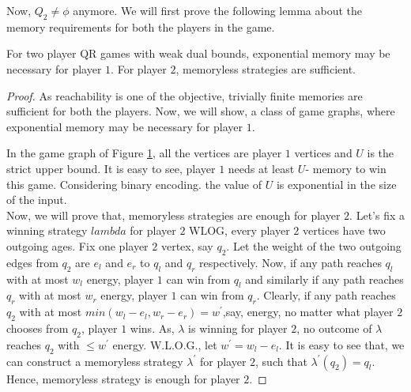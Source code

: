 Now, $Q_2 \not = \phi$ anymore. We will first prove the following lemma about the memory requirements for both the players in the game.\\
\begin{lemma}
\label{mem-lemma}
For two player QR games with weak dual bounds, exponential memory may be necessary for player $1$. For player $2$, memoryless strategies are sufficient.
\end{lemma}
\begin{proof}
As reachability is one of the objective, trivially finite memories are sufficient for both the players. Now, we will show, a class of game graphs, where exponential memory may be necessary for player $1$.\\
\begin{figure}[htb]
\hskip 6cm
\label{expmem-p1}

\end{figure}

In the game graph of Figure \ref{expmem-p1}, all the vertices are player $1$  vertices and $U$ is the strict upper bound. It is easy to see, player $1$ needs at least $U$- memory to win this game. Considering binary encoding. the value of $U$ is exponential in the size of the input.\\
Now, we will prove that, memoryless strategies are enough for player $2$. Let's fix a winning strategy $lambda$ for player $2$  WLOG, every player $2$ vertices have two outgoing ages. Fix one player $2$ vertex, say $q_2$. Let the weight of the two outgoing edges from $q_2$ are $e_l$ and $e_r$ to $q_l$ and $q_r$ respectively. Now, if any path reaches $q_l$ with at most $w_l$ energy, player $1$ can win from $q_l$ and similarly if any path reaches $q_r$ with at most $w_r$ energy, player $1$ can win from $q_r$. Clearly, if any path reaches $q_2$ with at most $min(w_l-e_l, w_r-e_r)= w^{\prime}$,say, energy, no matter what player $2$ chooses from $q_2$, player $1$ wins. As, $\lambda$ is winning for player $2$, no outcome of $\lambda$ reaches $q_2$ with $\leq w^{\prime}$ energy. W.L.O.G., let $w^{\prime}= w_l -e_l$. It is easy to see that, we can construct a memoryless strategy $\lambda^{\prime}$ for player $2$, such that $\lambda^{\prime}(q_2)=q_l$. Hence, memoryless strategy is enough for player $2$.
\end{proof}
\vskip 0.5cm
\vskip 0.2cm
